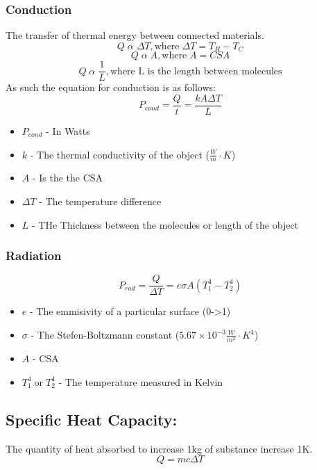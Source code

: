 \documentclass[a5paper]{report}
\begin{document}
	\subsubsection*{Conduction}
	The transfer of thermal energy between connected materials.
	$$Q\;\alpha\;\Delta T, \text{where}\;\Delta T=T_{H}-T_{C}$$
	$$Q\;\alpha\;A, \text{where}\;A=CSA$$
	$$Q\;\alpha\;\frac{1}{L}, \text{where L is the length between molecules}$$
	As such the equation for conduction is as follows:
	$$P_{cond}=\frac{Q}{t}=\frac{kA \Delta T}{L}$$
	\begin{itemize}
		\item $P_{cond}$ - In Watts
		\item $k$ - The thermal conductivity of the object ($\frac{W}{m}\cdot K$)
		\item $A$ -  Is the the CSA
		\item $\Delta T$ - The temperature difference
		\item $L$ - THe Thickness between the molecules or length of the object
	\end{itemize}

	\subsubsection*{Radiation}
	$$P_{rad}=\frac{Q}{\Delta T}=e\sigma A(T_{1}^{4}-T_{2}^{4})$$
	\begin{itemize}
		\item $e$ - The emmisivity of a particular surface (0->1)
		\item $\sigma$ - The Stefen-Boltzmann constant ($5.67\times 10^{-3} \frac{W}{m^{2}}\cdot K^{4}$)
		\item $A$ - CSA
		\item $T_{1}^{4}\;\text{or}\;T_{2}^{4}$ - The temperature measured in Kelvin
	\end{itemize}

	\subsection*{Specific Heat Capacity:}
	The quantity of heat absorbed to increase 1kg of substance increase 1K.
	$$Q=mc\Delta T$$
\end{document}
